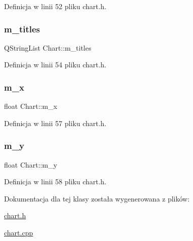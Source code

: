 Definicja w linii 52 pliku chart.\+h.

\mbox{\label{class_chart_a55c846b0e4068481081d061559efd155}} 
\subsubsection{\texorpdfstring{m\+\_\+titles}{m\_titles}}
{\footnotesize\ttfamily Q\+String\+List Chart\+::m\+\_\+titles\hspace{0.3cm}{\ttfamily [private]}}



Definicja w linii 54 pliku chart.\+h.

\mbox{\label{class_chart_ac5211a2a9116f2853ae511417b9bca9e}} 
\subsubsection{\texorpdfstring{m\+\_\+x}{m\_x}}
{\footnotesize\ttfamily float Chart\+::m\+\_\+x\hspace{0.3cm}{\ttfamily [private]}}



Definicja w linii 57 pliku chart.\+h.

\mbox{\label{class_chart_a1f3e3584c5d5d90d8ebaf1b6b98d3df5}} 
\subsubsection{\texorpdfstring{m\+\_\+y}{m\_y}}
{\footnotesize\ttfamily float Chart\+::m\+\_\+y\hspace{0.3cm}{\ttfamily [private]}}



Definicja w linii 58 pliku chart.\+h.



Dokumentacja dla tej klasy została wygenerowana z plików\+:\begin{DoxyCompactItemize}
\item 
\hyperlink{chart_8h}{chart.\+h}\item 
\hyperlink{chart_8cpp}{chart.\+cpp}\end{DoxyCompactItemize}
